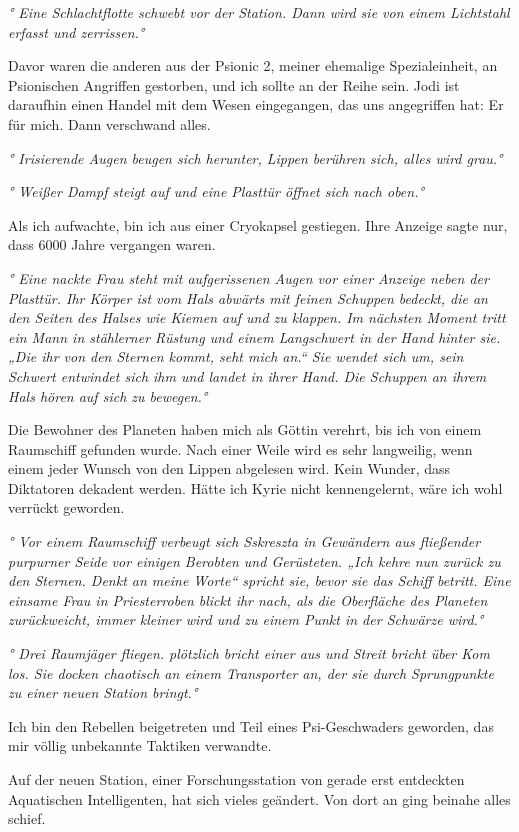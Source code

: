 \documentclass[11pt]{scrartcl}
\begin{document}
\emph{° Eine Schlachtflotte schwebt vor der Station. Dann wird sie von
einem Lichtstahl erfasst und zerrissen.°}

Davor waren die anderen aus der Psionic 2, meiner ehemalige
Spezialeinheit, an Psionischen Angriffen gestorben, und ich sollte an
der Reihe sein. Jodi ist daraufhin einen Handel mit dem Wesen
eingegangen, das uns angegriffen hat: Er für mich. Dann verschwand
alles.

\emph{° Irisierende Augen beugen sich herunter, Lippen berühren sich,
alles wird grau.°}

\emph{° Weißer Dampf steigt auf und eine Plasttür öffnet sich nach
oben.°}

Als ich aufwachte, bin ich aus einer Cryokapsel gestiegen. Ihre Anzeige
sagte nur, dass 6000 Jahre vergangen waren.

\emph{° Eine nackte Frau steht mit aufgerissenen Augen vor einer Anzeige
neben der Plasttür. Ihr Körper ist vom Hals abwärts mit feinen Schuppen
bedeckt, die an den Seiten des Halses wie Kiemen auf und zu klappen. Im
nächsten Moment tritt ein Mann in stählerner Rüstung und einem
Langschwert in der Hand hinter sie. „Die ihr von den Sternen kommt, seht
mich an.`` Sie wendet sich um, sein Schwert entwindet sich ihm und
landet in ihrer Hand. Die Schuppen an ihrem Hals hören auf sich zu
bewegen.°}

Die Bewohner des Planeten haben mich als Göttin verehrt, bis ich von
einem Raumschiff gefunden wurde. Nach einer Weile wird es sehr
langweilig, wenn einem jeder Wunsch von den Lippen abgelesen wird. Kein
Wunder, dass Diktatoren dekadent werden. Hätte ich Kyrie nicht
kennengelernt, wäre ich wohl verrückt geworden.

\emph{° Vor einem Raumschiff verbeugt sich Sskreszta in Gewändern aus
fließender purpurner Seide vor einigen Berobten und Gerüsteten. „Ich
kehre nun zurück zu den Sternen. Denkt an meine Worte`` spricht sie,
bevor sie das Schiff betritt. Eine einsame Frau in Priesterroben blickt
ihr nach, als die Oberfläche des Planeten zurückweicht, immer kleiner
wird und zu einem Punkt in der Schwärze wird.°}

\emph{° Drei Raumjäger fliegen. plötzlich bricht einer aus und Streit
bricht über Kom los. Sie docken chaotisch an einem Transporter an, der
sie durch Sprungpunkte zu einer neuen Station bringt.°}

Ich bin den Rebellen beigetreten und Teil eines Psi-Geschwaders
geworden, das mir völlig unbekannte Taktiken verwandte.

Auf der neuen Station, einer Forschungsstation von gerade erst
entdeckten Aquatischen Intelligenten, hat sich vieles geändert. Von dort
an ging beinahe alles schief.
\end{document}
